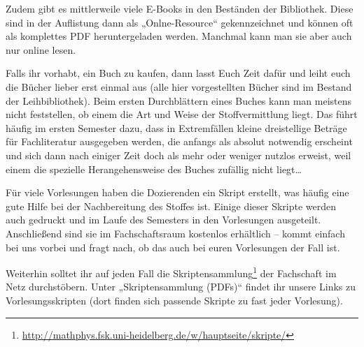 Zudem gibt es mittlerweile viele E-Books in den Beständen der Bibliothek. Diese sind 
in der Auflistung dann als „Onlne-Resource“ gekennzeichnet und können oft als komplettes
PDF heruntergeladen werden. Manchmal kann man sie aber auch nur online lesen.

Falls ihr vorhabt, ein Buch zu kaufen, dann lasst Euch Zeit dafür und leiht euch
die Bücher lieber erst einmal aus (alle hier vorgestellten Bücher sind im Bestand
der Leihbibliothek). Beim ersten Durchblättern eines Buches kann man meistens
nicht feststellen, ob einem die Art und Weise der Stoffvermittlung liegt. Das
führt häufig im ersten Semester dazu, dass in Extremfällen kleine dreistellige
Beträge für Fachliteratur ausgegeben werden, die anfangs als absolut notwendig
erscheint und sich dann nach einiger Zeit doch als mehr oder weniger nutzlos
erweist, weil einem die spezielle Herangehensweise des Buches zufällig nicht liegt\dots

Für viele Vorlesungen haben die Dozierenden ein Skript erstellt, was häufig eine gute
Hilfe bei der Nachbereitung des Stoffes ist. Einige dieser Skripte werden auch gedruckt
und im Laufe des Semesters in den Vorlesungen ausgeteilt. Anschließend sind sie im 
Fachschaftsraum kostenlos erhältlich -- kommt einfach bei uns vorbei und fragt nach,
ob das auch bei euren Vorlesungen der Fall ist.

Weiterhin solltet ihr auf jeden Fall die Skriptensammlung\footnote{\url{http://mathphys.fsk.uni-heidelberg.de/w/hauptseite/skripte/}}
der Fachschaft im Netz durchstöbern. Unter „Skriptensammlung (PDFs)“ findet
ihr unsere Links zu Vorlesungsskripten (dort finden sich passende Skripte zu fast
jeder Vorlesung).

